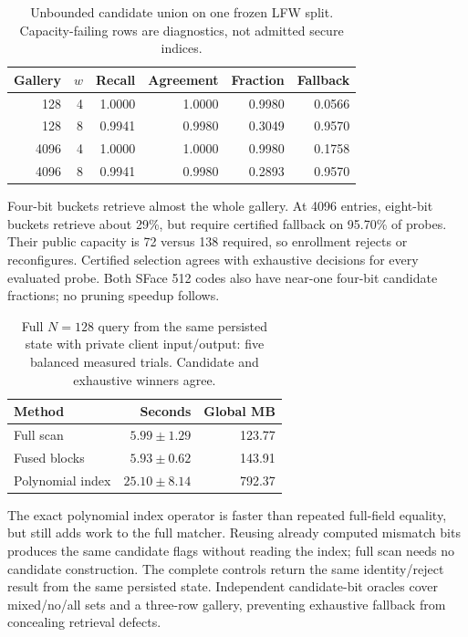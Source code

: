 \begin{table}[t]
\caption{Unbounded candidate union on one frozen LFW split. Capacity-failing rows are diagnostics, not admitted secure indices.}
\label{tab:index}\centering\small
\setlength{\tabcolsep}{3pt}
\begin{tabular}{rrrrrr}
\toprule
Gallery & $w$ & Recall & Agreement & Fraction & Fallback \\
\midrule
128 & 4 & 1.0000 & 1.0000 & 0.9980 & 0.0566 \\
128 & 8 & 0.9941 & 0.9980 & 0.3049 & 0.9570 \\
4096 & 4 & 1.0000 & 1.0000 & 0.9980 & 0.1758 \\
4096 & 8 & 0.9941 & 0.9980 & 0.2893 & 0.9570 \\
\bottomrule
\end{tabular}
\end{table}

Four-bit buckets retrieve almost the whole gallery. At 4096 entries, eight-bit buckets retrieve about 29\%, but require certified fallback on 95.70\% of probes. Their public capacity is 72 versus 138 required, so enrollment rejects or reconfigures. Certified selection agrees with exhaustive decisions for every evaluated probe. Both SFace 512 codes also have near-one four-bit candidate fractions; no pruning speedup follows.

\begin{table}[t]
\caption{Full $N=128$ query from the same persisted state with private client input/output: five balanced measured trials. Candidate and exhaustive winners agree.}
\label{tab:v3privatequery}\centering\small
\setlength{\tabcolsep}{3pt}
\begin{tabular}{lrr}
\toprule
Method & Seconds & Global MB \\
\midrule
Full scan & $5.99\pm1.29$ & 123.77 \\
Fused blocks & $5.93\pm0.62$ & 143.91 \\
Polynomial index & $25.10\pm8.14$ & 792.37 \\
\bottomrule
\end{tabular}
\end{table}

The exact polynomial index operator is faster than repeated full-field equality, but still adds work to the full matcher. Reusing already computed mismatch bits produces the same candidate flags without reading the index; full scan needs no candidate construction. The complete controls return the same identity/reject result from the same persisted state. Independent candidate-bit oracles cover mixed/no/all sets and a three-row gallery, preventing exhaustive fallback from concealing retrieval defects.

